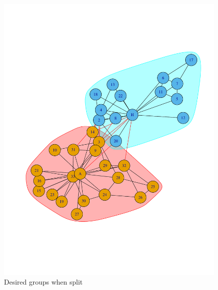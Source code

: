 \documentclass[letterpaper,11pt]{article}
\begin{document}
\begin{figure}[h]
\centering
\includegraphics[scale=0.6]{actualSplitDesired.pdf}
\caption{Desired groups when split}
\label{fig:q1desired}
\end{figure}
\end{document}
